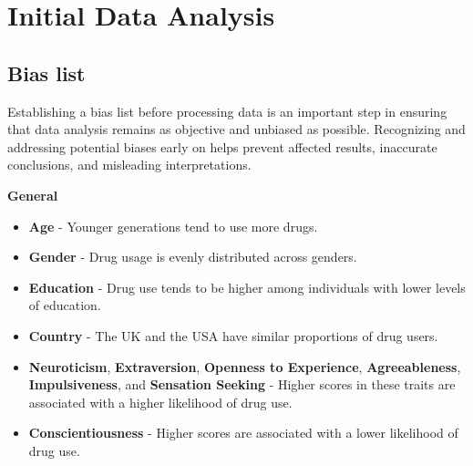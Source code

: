 \documentclass{article}
\begin{document}
\newpage

\section{Initial Data Analysis}
\subsection{Bias list}
Establishing a bias list before processing data is an important step in ensuring that data analysis remains as objective and unbiased as possible. Recognizing and addressing potential biases early on helps prevent affected results, inaccurate conclusions, and misleading interpretations. 

\textbf{General}
\begin{itemize}
    \item \textbf{Age} - Younger generations tend to use more drugs.
    \item \textbf{Gender} - Drug usage is evenly distributed across genders.
    \item \textbf{Education} - Drug use tends to be higher among individuals with lower levels of education.
    \item \textbf{Country} - The UK and the USA have similar proportions of drug users.
    \item \textbf{Neuroticism}, \textbf{Extraversion}, \textbf{Openness to Experience}, \textbf{Agreeableness}, \textbf{Impulsiveness}, and \textbf{Sensation Seeking} - Higher scores in these traits are associated with a higher likelihood of drug use.
    \item \textbf{Conscientiousness} - Higher scores are associated with a lower likelihood of drug use.
\end{itemize}
\end{document}
